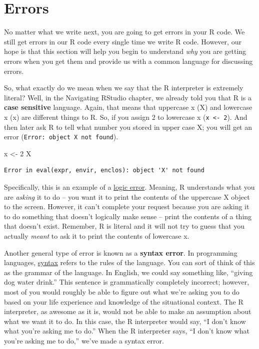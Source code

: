 \documentclass[
  letterpaper,
  DIV=11,
  numbers=noendperiod]{scrreprt}
\newenvironment{Shaded}{\begin{snugshade}}{\end{snugshade}}
\newcommand{\DecValTok}[1]{\textcolor[rgb]{0.68,0.00,0.00}{#1}}
\newcommand{\NormalTok}[1]{\textcolor[rgb]{0.00,0.23,0.31}{#1}}
\newcommand{\OtherTok}[1]{\textcolor[rgb]{0.00,0.23,0.31}{#1}}
\begin{document}
\section{Errors}\label{errors}

No matter what we write next, you are going to get errors in your R
code. We still get errors in our R code every single time we write R
code. However, our hope is that this section will help you begin to
understand \emph{why} you are getting errors when you get them and
provide us with a common language for discussing errors.

So, what exactly do we mean when we say that the R interpreter is
extremely literal? Well, in the Navigating RStudio chapter, we already
told you that R is a \textbf{case sensitive} language. Again, that means
that uppercase x (X) and lowercase x (x) are different things to R. So,
if you assign 2 to lowercase x (\texttt{x\ \textless{}-\ 2}). And then
later ask R to tell what number you stored in upper case X; you will get
an error
(\texttt{Error:\ object\ \textquotesingle{}X\textquotesingle{}\ not\ found}).

\begin{Shaded}
\begin{Highlighting}[]
\NormalTok{x }\OtherTok{\textless{}{-}} \DecValTok{2}
\NormalTok{X}
\end{Highlighting}
\end{Shaded}

\begin{verbatim}
Error in eval(expr, envir, enclos): object 'X' not found
\end{verbatim}

Specifically, this is an example of a
\hyperref[glossary-logic-error]{logic error}. Meaning, R understands
what you are \emph{asking} it to do -- you want it to print the contents
of the uppercase X object to the screen. However, it can't complete your
request because you are asking it to do something that doesn't logically
make sense -- print the contents of a thing that doesn't exist.
Remember, R is literal and it will not try to guess that you actually
\emph{meant} to ask it to print the contents of lowercase x.

Another general type of error is known as a \textbf{syntax error}. In
programming languages, \hyperref[glossary-syntax]{syntax} refers to the
rules of the language. You can sort of think of this as the grammar of
the language. In English, we could say something like, ``giving dog
water drink.'' This sentence is grammatically completely incorrect;
however, most of you would roughly be able to figure out what we're
asking you to do based on your life experience and knowledge of the
situational context. The R interpreter, as awesome as it is, would not
be able to make an assumption about what we want it to do. In this case,
the R interpreter would say, ``I don't know what you're asking me to
do.'' When the R interpreter says, ``I don't know what you're asking me
to do,'' we've made a syntax error.
\end{document}
